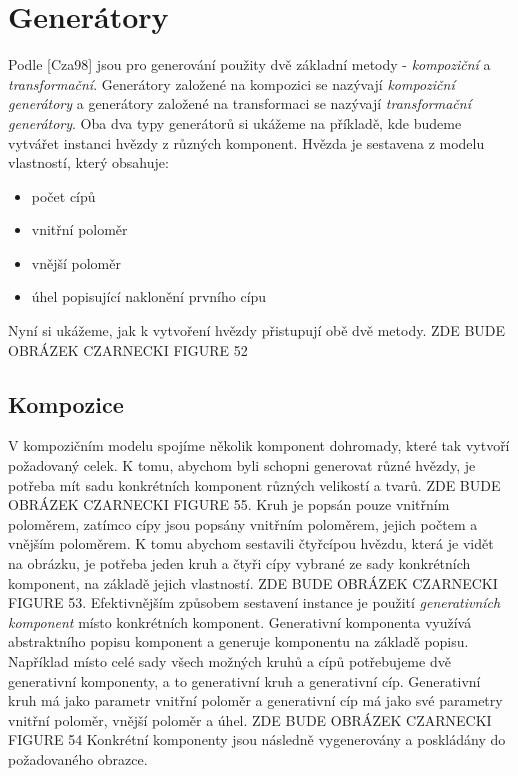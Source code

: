 \section{Generátory}
Podle [Cza98] jsou pro generování použity dvě základní metody - \textit{kompoziční} a \textit{transformační}. Generátory založené na kompozici se nazývají \textit{kompoziční generátory} a generátory založené na transformaci se nazývají \textit{transformační generátory}. Oba dva typy generátorů si ukážeme na příkladě, kde budeme vytvářet instanci hvězdy z různých komponent. Hvězda je sestavena z modelu vlastností, který obsahuje:
\begin{itemize}
	\item počet cípů
	\item vnitřní poloměr
	\item vnější poloměr
	\item úhel popisující naklonění prvního cípu
\end{itemize}
Nyní si ukážeme, jak k vytvoření hvězdy přistupují obě dvě metody.
\newline
\newline
ZDE BUDE OBRÁZEK CZARNECKI FIGURE 52
\newline
\newline

\subsection{Kompozice}
V kompozičním modelu spojíme několik komponent dohromady, které tak vytvoří požadovaný celek. K tomu, abychom byli schopni generovat různé hvězdy, je potřeba mít sadu konkrétních komponent různých velikostí a tvarů.
\newline
\newline
ZDE BUDE OBRÁZEK CZARNECKI FIGURE 55.
\newline
\newline
Kruh je popsán pouze vnitřním poloměrem, zatímco cípy jsou popsány vnitřním poloměrem, jejich počtem a vnějším poloměrem. K tomu abychom sestavili čtyřcípou hvězdu, která je vidět na obrázku, je potřeba jeden kruh a čtyři cípy vybrané ze sady konkrétních komponent, na základě jejich vlastností.
\newline
\newline
ZDE BUDE OBRÁZEK CZARNECKI FIGURE 53.
\newline
\newline
Efektivnějším způsobem sestavení instance je použití \textit{generativních komponent} místo konkrétních komponent. Generativní komponenta využívá abstraktního popisu komponent a generuje komponentu na základě popisu. Například místo celé sady všech možných kruhů a cípů potřebujeme dvě generativní komponenty, a to generativní kruh a generativní cíp. Generativní kruh má jako parametr vnitřní poloměr a generativní cíp má jako své parametry vnitřní poloměr, vnější poloměr a úhel.
\newline
\newline
ZDE BUDE OBRÁZEK CZARNECKI FIGURE 54
\newline
\newline
Konkrétní komponenty jsou následně vygenerovány a poskládány do požadovaného obrazce.

